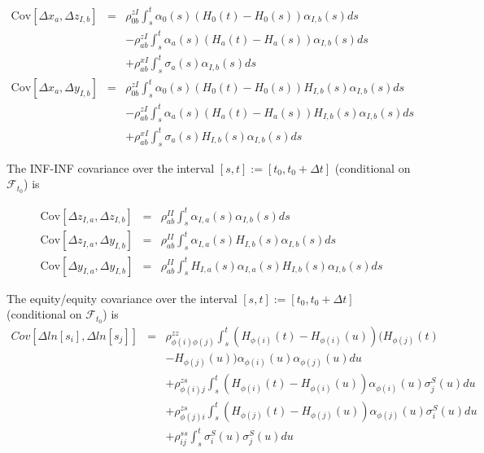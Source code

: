 \documentclass[12pt, a4paper]{article}
\begin{document}
{{\begin{appendix}
\begin{eqnarray*}
  \mathrm{Cov}[ \Delta x_a, \Delta z_{I,b} ] & = & \rho_{0b}^{zI} \int_s^t \alpha_0(s) (H_0(t)-H_0(s)) \alpha_{I,b}(s) ds \\
                                             & & -\rho_{ab}^{zI} \int_s^t \alpha_a(s)(H_a(t)-H_a(s))\alpha_{I,b}(s) ds \\
                                             & & +\rho_{ab}^{xI}\int_s^t \sigma_a(s) \alpha_{I,b}(s) ds \\
  \mathrm{Cov}[ \Delta x_a, \Delta y_{I,b} ] & = & \rho_{0b}^{zI} \int_s^t \alpha_0(s) (H_0(t)-H_0(s)) H_{I,b}(s)\alpha_{I,b}(s) ds \\
                                             & & -\rho_{ab}^{zI} \int_s^t \alpha_a(s)(H_a(t)-H_a(s))H_{I,b}(s)\alpha_{I,b}(s) ds \\
                                             & & +\rho_{ab}^{xI}\int_s^t \sigma_a(s) H_{I,b}(s)\alpha_{I,b}(s) ds
\end{eqnarray*}

The INF-INF covariance over the interval $[s,t] := [t_0, t_0+\Delta t]$ (conditional on $\mathcal{F}_{t_0}$) is

\begin{eqnarray*}
  \mathrm{Cov}[ \Delta z_{I,a}, \Delta z_{I,b} ] & = & \rho_{ab}^{II} \int_s^t \alpha_{I,a}(s) \alpha_{I,b}(s) ds \\
  \mathrm{Cov}[ \Delta z_{I,a}, \Delta y_{I,b} ] & = & \rho_{ab}^{II} \int_s^t \alpha_{I,a}(s) H_{I,b}(s)
                                                       \alpha_{I,b}(s) ds \\
  \mathrm{Cov}[ \Delta y_{I,a}, \Delta y_{I,b} ] & = & \rho_{ab}^{II} \int_s^t H_{I,a}(s) \alpha_{I,a}(s) H_{I,b}(s) \alpha_{I,b}(s) ds
\end{eqnarray*}

The equity/equity covariance over the interval $[s,t] := [t_0, t_0+\Delta t]$ (conditional on $\mathcal{F}_{t_0}$) is
\begin{eqnarray*}
	Cov \left[\Delta ln[s_i], \Delta ln[s_j] \right] &=&
	\rho_{\phi(i) \phi(j)}^{zz}\int_s^t (H_{\phi(i)} (t) - H_{\phi(i)} (u)) (H_{\phi(j)} (t)\\
	&& - H_{\phi(j)} (u)) \alpha_{\phi(i)}(u) \alpha_{\phi(j)}(u) du\\
	&&+ \rho_{\phi(i) j}^{zs} \int_s^t (H_{\phi(i)} (t) - H_{\phi(i)} (u)) \alpha_{\phi(i)}(u) \sigma_j^S(u) du\\
	&&+ \rho_{\phi(j) i}^{zs} \int_s^t (H_{\phi(j)} (t) - H_{\phi(j)} (u)) \alpha_{\phi(j)}(u) \sigma_i^S(u) du\\
	&&+ \rho_{ij}^{ss} \int_s^t \sigma_i^S(u) \sigma_j^S(u) du\\
\end{eqnarray*}


\end{appendix}}}
\end{document}
